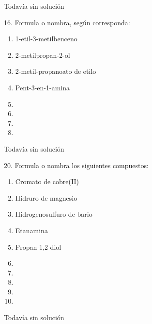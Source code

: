 \documentclass[twocolumn]{article}
\begin{document}
\begin{solution}[print=false]
  Todavía sin solución
\end{solution}

\begin{exercise}
  16. Formula o nombra, según corresponda:
  \begin{enumerate}
    \item 1-etil-3-metilbenceno
    \item 2-metilpropan-2-ol
    \item 2-metil-propanoato de etilo
    \item Pent-3-en-1-amina
    \item {}
    \item {}
    \item {}
    \item {}
  \end{enumerate}
\end{exercise}

\begin{solution}[print=false]
  Todavía sin solución
\end{solution}

\begin{exercise}
  20. Formula o nombra los siguientes compuestos:
  \begin{enumerate}
    \item Cromato de cobre(II)
    \item Hidruro de magnesio
    \item Hidrogenosulfuro de bario
    \item Etanamina
    \item Propan-1,2-diol
    \item {}
    \item {}
    \item {}
    \item {} %
    \item {}
  \end{enumerate}
\end{exercise}

\begin{solution}[print=false]
  Todavía sin solución
\end{solution}
\end{document}
